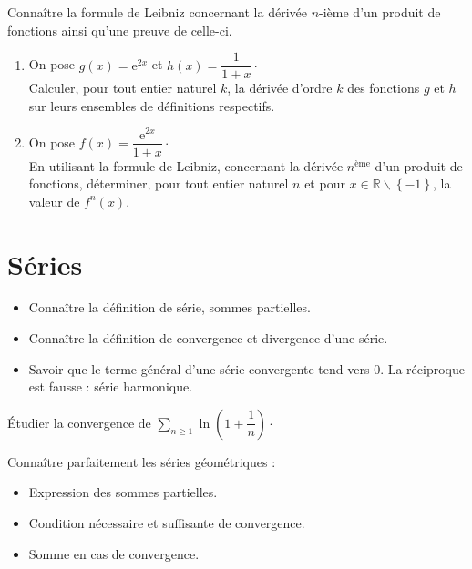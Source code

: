 \documentclass[a4paper,twoside,french,10pt]{VcCours}
\begin{document}
\medskip

\begin{ptc}{}
	Connaître la formule de Leibniz concernant la dérivée $n$-ième d'un produit de fonctions ainsi qu'une preuve de celle-ci.
\end{ptc}

\medskip

\begin{Exercice}{}\end{Exercice} \begin{enumerate}
\item
On pose $g(x)=\mathrm{e}^{2x}$ et $h(x)=\dfrac{1}{1+x} \cdot$\\
Calculer, pour tout entier naturel $k$, la dérivée d'ordre $k$ des fonctions $g$ et $h$ sur leurs ensembles de définitions respectifs.
\item 
On pose $f(x)=\dfrac{\mathrm{e}^{2x}}{1+x}\cdot$\\
En utilisant la formule de Leibniz, concernant la dérivée $n^{\text{ème}}$ d'un produit de fonctions, déterminer, pour tout entier naturel $n$ et pour $x\in\mathbb{R}\backslash\left\lbrace -1\right\rbrace $, la valeur de $f^{n}(x)$.
\end{enumerate}

\bigskip

\section{Séries}


\begin{ptc}{}
	
\begin{itemize}
\item Connaître la définition de série, sommes partielles.
\item Connaître la définition de convergence et divergence d'une série.
\item Savoir que le terme général d'une série convergente tend vers $0$. La réciproque est fausse : série harmonique.
\end{itemize}
\end{ptc}

\begin{Exercice}{}\end{Exercice} Étudier la convergence de $\sum_{n \geq 1} \ln \left( 1 + \dfrac{1}{n} \right) \cdot$



\begin{ptc}{}
	Connaître parfaitement les séries géométriques :
\begin{itemize}
\item Expression des sommes partielles.
\item Condition nécessaire et suffisante de convergence.
\item Somme en cas de convergence.
\end{itemize}
\end{ptc}
\end{document}
